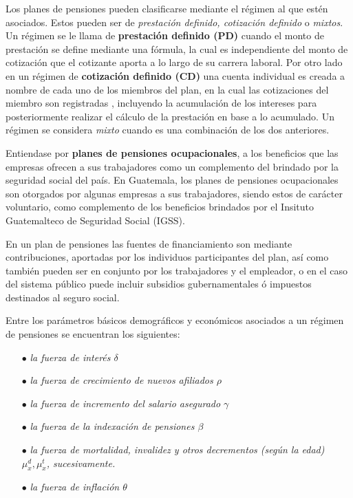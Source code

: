 \documentclass[12pt,letterpaper,titlepage]{article}
\begin{document}
Los planes de pensiones pueden clasificarse mediante el régimen al que estén asociados. Estos pueden ser de \textit{prestación definido,  cotización definido} o \textit{mixtos}. Un régimen se le llama de \textbf{prestación definido (PD)} cuando el monto de prestación se define mediante una fórmula, la cual es independiente del monto de cotización que el cotizante aporta a lo largo de su carrera laboral. Por otro lado en un régimen de \textbf{cotización definido (CD)} una cuenta individual es creada a nombre de cada uno de los miembros del plan, en la cual las cotizaciones del miembro son registradas \cite{778}, incluyendo la acumulación de los intereses para posteriormente realizar el cálculo de la prestación en base a lo acumulado. Un régimen se considera \textit{mixto} cuando es una combinación de los dos anteriores. 

Entiendase por \textbf{planes de pensiones ocupacionales}, a los beneficios que las empresas ofrecen a sus trabajadores como un complemento del brindado por la seguridad social del país. En Guatemala, los planes de pensiones ocupacionales son otorgados por algunas empresas a sus trabajadores, siendo estos de carácter voluntario, como complemento de los beneficios brindados por el Insituto Guatemalteco de Seguridad Social (IGSS). 


 En un plan de pensiones las fuentes de financiamiento son mediante contribuciones, aportadas por los individuos participantes del plan, así como también pueden ser en conjunto por los trabajadores y el empleador, o en el caso del sistema público puede incluir subsidios gubernamentales ó impuestos destinados al seguro social. 
 
 Entre los parámetros básicos demográficos y económicos asociados a un régimen de pensiones se encuentran los siguientes:
 
\begin{itemize}
	\item [$\bullet$] \textit{la fuerza de interés $\delta$}
 	\item [$\bullet$] \textit{la fuerza de crecimiento de nuevos afiliados $\rho$}
 	\item [$\bullet$] \textit{la fuerza de incremento del salario asegurado $\gamma$}
 	\item [$\bullet$] \textit{la fuerza de la indexación de pensiones $\beta$}
 	\item [$\bullet$] \textit{la fuerza de mortalidad, invalidez y otros decrementos (según la edad) $\mu_{x}^{d}, \mu_{x}^{t}$, sucesivamente.}
 	\item [$\bullet$] \textit{la fuerza de inflación $\theta$}
 \end{itemize}
 
\end{document}

